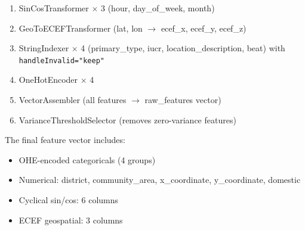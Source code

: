 \begin{enumerate}
    \item SinCosTransformer $\times$ 3 (hour, day\_of\_week, month)
    \item GeoToECEFTransformer (lat, lon $\rightarrow$ ecef\_x, ecef\_y, ecef\_z)
    \item StringIndexer $\times$ 4 (primary\_type, iucr, location\_description, beat) with \texttt{handleInvalid="keep"}
    \item OneHotEncoder $\times$ 4
    \item VectorAssembler (all features $\rightarrow$ raw\_features vector)
    \item VarianceThresholdSelector (removes zero-variance features)
\end{enumerate}

The final feature vector includes:
\begin{itemize}
    \item OHE-encoded categoricals (4 groups)
    \item Numerical: district, community\_area, x\_coordinate, y\_coordinate, domestic
    \item Cyclical sin/cos: 6 columns
    \item ECEF geospatial: 3 columns
\end{itemize}
